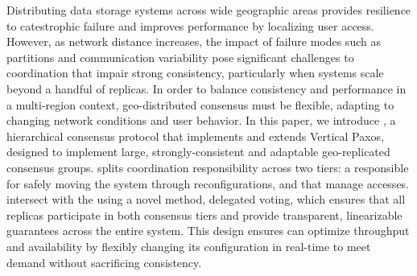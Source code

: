 Distributing data storage systems across wide geographic areas provides resilience to
catestrophic failure and improves performance by localizing user access.
However, as network distance increases, the impact of failure modes such as partitions
and communication variability pose significant challenges to coordination that impair
strong consistency, particularly when systems scale beyond a handful of replicas.
In order to balance consistency and performance in a multi-region context, geo-distributed
consensus must be flexible, adapting to changing network conditions and user behavior.
In this paper, we introduce \sys, a hierarchical consensus protocol that implements and
extends Vertical Paxos, designed to implement large, strongly-consistent and adaptable
geo-replicated consensus groups.
\sys splits coordination responsibility across two tiers: a \roo responsible for
safely moving the system through reconfigurations, and \subs that manage accesses.
\Subs intersect with the \roo using a novel method, delegated voting, which ensures that
all replicas participate in both consensus tiers and provide transparent, linearizable
guarantees across the entire system.
This design ensures \sys can optimize throughput and availability by flexibly changing
its configuration in real-time to meet demand without sacrificing consistency.
